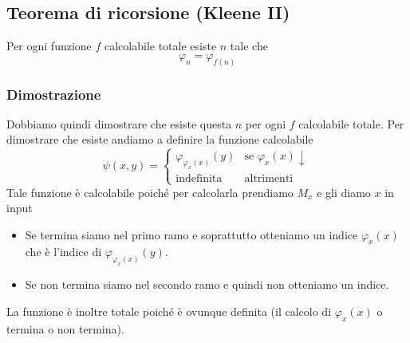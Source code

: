 \subsection{Teorema di ricorsione (Kleene II)}

Per ogni funzione $f$ calcolabile totale esiste $n$ tale che
\[ \varphi_n = \varphi_{f(n)} \]

\subsubsection{Dimostrazione}

Dobbiamo quindi dimostrare che esiste questa $n$ per ogni $f$
calcolabile totale. Per dimostrare che esiste andiamo a definire
la funzione calcolabile
\[
	\psi (x, y) = \begin{cases}
		\varphi_{\varphi_x(x)} (y) & \text{se } \varphi_x (x) \downarrow \\
		\text{indefinita}          & \text{altrimenti}
	\end{cases}
\]
Tale funzione è calcolabile poiché per calcolarla prendiamo
$M_x$ e gli diamo $x$ in input
\begin{itemize}
	\item Se termina siamo nel primo ramo e soprattutto
	      otteniamo un indice $\varphi_x(x)$ che è l'indice di
	      $\varphi_{\varphi_x(x)} (y)$.
	\item Se non termina siamo nel secondo ramo e quindi non
	      otteniamo un indice.
\end{itemize}
La funzione è inoltre totale poiché è ovunque definita (il
calcolo di $\varphi_x (x)$ o termina o non termina).

